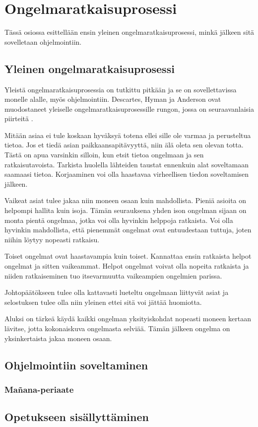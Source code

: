 \section{Ongelmaratkaisuprosessi}

Tässä osiossa esittellään ensin yleinen ongelmaratkaisuprosessi, minkä jälkeen
sitä sovelletaan ohjelmointiin.

\subsection{Yleinen ongelmaratkaisuprosessi}

Yleistä ongelmaratkaisuprosessia on tutkittu pitkään ja se on sovellettavissa
monelle alalle, myös ohjelmointiin. Descartes, Hyman ja Anderson ovat
muodostaneet yleiselle ongelmaratkaisuprosessille rungon, jossa on
seuraavanlaisia piirteitä \cite{Gries:1974:WTI:953057.810447}.

Mitään asiaa ei tule koskaan hyväksyä totena ellei sille ole varmaa ja
perusteltua tietoa. Jos et tiedä asian paikkaansapitävyyttä, niin älä oleta sen
olevan totta. Tästä on apua varsinkin silloin, kun etsit tietoa ongelmaan ja sen
ratkaisutavoista. Tarkista huolella lähteiden taustat ennenkuin alat soveltamaan
saamaasi tietoa. Korjaaminen voi olla haastavaa virheellisen tiedon soveltamisen
jälkeen.

Vaikeat asiat tulee jakaa niin moneen osaan kuin mahdollista. Pieniä asioita on
helpompi hallita kuin isoja. Tämän seurauksena yhden ison ongelman sijaan on
monta pientä ongelmaa, jotka voi olla hyvinkin helppoja ratkaista. Voi olla
hyvinkin mahdollista, että pienemmät ongelmat ovat entuudestaan tuttuja, joten
niihin löytyy nopeasti ratkaisu.

Toiset ongelmat ovat haastavampia kuin toiset. Kannattaa ensin ratkaista helpot
ongelmat ja sitten vaikeammat. Helpot ongelmat voivat olla nopeita ratkaista ja
niiden ratkaiseminen tuo itsevarmuutta vaikeampien ongelmien parissa.

Johtopäätökseen tulee olla kattavasti lueteltu ongelmaan liittyvät asiat ja
selostuksen tulee olla niin yleinen ettei sitä voi jättää huomiotta.

Aluksi on tärkeä käydä kaikki ongelman yksityiskohdat nopeasti moneen kertaan
lävitse, jotta kokonaiskuva ongelmasta selviää. Tämän jälkeen ongelma on
yksinkertaista jakaa moneen osaan. %

\subsection{Ohjelmointiin soveltaminen}

\subsubsection{Mañana-periaate}


\subsection{Opetukseen sisällyttäminen}

